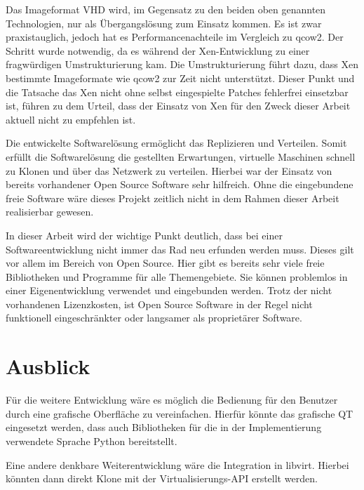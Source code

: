 Das Imageformat VHD wird, im Gegensatz zu den beiden oben genannten Technologien, nur als Übergangslösung zum Einsatz kommen. Es ist zwar praxistauglich, jedoch hat es Performancenachteile im Vergleich zu qcow2. Der Schritt wurde notwendig, da es während der Xen-Entwicklung zu einer fragwürdigen Umstrukturierung kam. Die Umstrukturierung führt dazu, dass Xen bestimmte Imageformate wie qcow2 zur Zeit nicht unterstützt. Dieser Punkt und die Tatsache das Xen nicht ohne selbst eingespielte Patches fehlerfrei einsetzbar ist, führen zu dem Urteil, dass der Einsatz von Xen für den Zweck dieser Arbeit aktuell nicht zu empfehlen ist.
{ \fontsize{11.9pt}{14.9pt}\selectfont
Die entwickelte Softwarelösung ermöglicht das Replizieren und Verteilen. Somit erfüllt die Softwarelösung die gestellten Erwartungen, virtuelle Maschinen schnell zu Klonen und über das Netzwerk zu verteilen. Hierbei war der Einsatz von bereits vorhandener Open Source Software sehr hilfreich. Ohne die eingebundene freie Software wäre dieses Projekt zeitlich nicht in dem Rahmen dieser Arbeit realisierbar gewesen.

In dieser Arbeit wird der wichtige Punkt deutlich, dass bei einer Softwareentwicklung nicht immer das Rad neu erfunden werden muss. Dieses gilt vor allem im Bereich von Open Source. Hier gibt es bereits sehr viele freie Bibliotheken und Programme für alle Themengebiete. Sie können problemlos in einer Eigenentwicklung verwendet und eingebunden werden. Trotz der nicht vorhandenen Lizenzkosten, ist Open Source Software in der Regel nicht funktionell eingeschränkter oder langsamer als proprietärer Software.

\section{Ausblick}
Für die weitere Entwicklung wäre es möglich die Bedienung für den Benutzer durch eine grafische Oberfläche zu vereinfachen. Hierfür könnte das grafische QT eingesetzt werden, dass auch Bibliotheken für die in der Implementierung verwendete Sprache Python bereitstellt. }

Eine andere denkbare Weiterentwicklung wäre die Integration in libvirt. Hierbei könnten dann direkt Klone mit der Virtualisierungs-API erstellt werden.